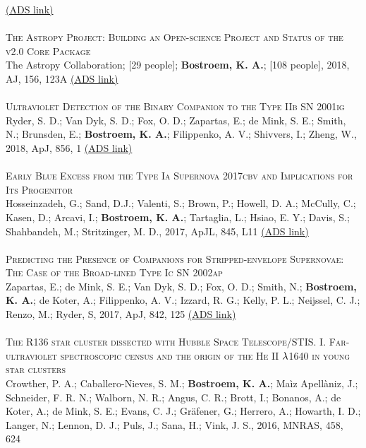 \color{blue}\href{https://ui.adsabs.harvard.edu/#abs/2019PASP..131b5002P/abstract}{(ADS link)}\color{black}\\
\\
\textsc{The Astropy Project: Building an Open-science Project and Status of the v2.0 Core Package}\\ 
The Astropy Collaboration; [29 people]; {\bf Bostroem, K. A.}; [108 people], 2018, AJ, 156, 123A
\color{blue}\href{https://ui.adsabs.harvard.edu/#abs/2018AJ....156..123A/abstract}{(ADS link)}\color{black}\\
\\
\textsc{Ultraviolet Detection of the Binary Companion to the Type IIb SN 2001ig}\\ 
Ryder, S. D.; Van Dyk, S. D.; Fox, O. D.; Zapartas, E.; de Mink, S. E.; Smith, N.; Brunsden, E.; {\bf Bostroem, K. A.}; Filippenko, A. V.; Shivvers, I.; Zheng, W., 2018, ApJ, 856, 1
\color{blue}\href{https://ui.adsabs.harvard.edu/#abs/2018ApJ...856...83R/abstract}{(ADS link)}\color{black}\\
\\
\textsc{Early Blue Excess from the Type Ia Supernova 2017cbv and Implications for Its Progenitor}\\ 
Hosseinzadeh, G.; Sand, D.J.; Valenti, S.; Brown, P.; Howell, D. A.; McCully, C.; Kasen, D.; Arcavi, I.; {\bf Bostroem, K. A.}; Tartaglia, L.; Hsiao, E. Y.; Davis, S.; Shahbandeh, M.; Stritzinger, M. D., 2017, ApJL, 845, L11
\color{blue}\href{https://ui.adsabs.harvard.edu/#abs/2017ApJ...845L..11H/abstract}{(ADS link)}\color{black}\\ %
\\
\textsc{Predicting the Presence of Companions for Stripped-envelope Supernovae: The Case of the Broad-lined Type Ic SN 2002ap}\\ 
Zapartas, E.; de Mink, S. E.; Van Dyk, S. D.; Fox, O. D.; Smith, N.; {\bf Bostroem, K. A.}; de Koter, A.; Filippenko, A. V.; Izzard, R. G.; Kelly, P. L.; Neijssel, C. J.; Renzo, M.; Ryder, S, 2017, ApJ, 842, 125
\color{blue}\href{https://ui.adsabs.harvard.edu/#abs/2017ApJ...842..125Z/abstract}{(ADS link)}\color{black}\\ %
\\
\textsc{The R136 star cluster dissected with Hubble Space Telescope/STIS. I. Far-ultraviolet spectroscopic census and the origin of the He II $\rm{\lambda}$1640 in young star clusters}\\ 
Crowther, P. A.; Caballero-Nieves, S. M.; {\bf Bostroem, K. A.}; Ma\`{i}z Apell\`{a}niz, J.; Schneider, F. R. N.; Walborn, N. R.; Angus, C. R.; Brott, I.; Bonanos, A.; de Koter, A.; de Mink, S. E.; Evans, C. J.; Gr\"{a}fener, G.; Herrero, A.; Howarth, I. D.; Langer, N.; Lennon, D. J.; Puls, J.; Sana, H.; Vink, J. S., 2016, MNRAS, 458, 624
